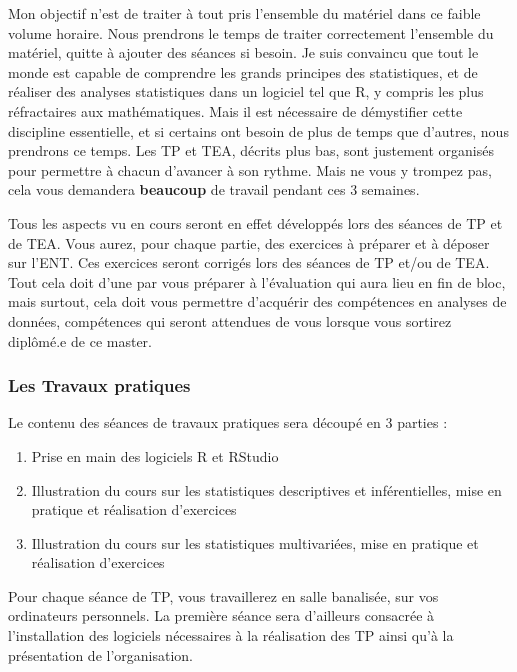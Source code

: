 \documentclass[a4paperpaper,]{article}
\providecommand{\tightlist}{%
  \setlength{\itemsep}{0pt}\setlength{\parskip}{0pt}}
\theoremstyle{definition}
\theoremstyle{definition}
\theoremstyle{definition}
\theoremstyle{remark}
\begin{document}
Mon objectif n'est de traiter à tout pris l'ensemble du matériel dans ce
faible volume horaire. Nous prendrons le temps de traiter correctement
l'ensemble du matériel, quitte à ajouter des séances si besoin. Je suis
convaincu que tout le monde est capable de comprendre les grands
principes des statistiques, et de réaliser des analyses statistiques
dans un logiciel tel que R, y compris les plus réfractaires aux
mathématiques. Mais il est nécessaire de démystifier cette discipline
essentielle, et si certains ont besoin de plus de temps que d'autres,
nous prendrons ce temps. Les TP et TEA, décrits plus bas, sont justement
organisés pour permettre à chacun d'avancer à son rythme. Mais ne vous y
trompez pas, cela vous demandera \textbf{beaucoup} de travail pendant
ces 3 semaines.

Tous les aspects vu en cours seront en effet développés lors des séances
de TP et de TEA. Vous aurez, pour chaque partie, des exercices à
préparer et à déposer sur l'ENT. Ces exercices seront corrigés lors des
séances de TP et/ou de TEA. Tout cela doit d'une par vous préparer à
l'évaluation qui aura lieu en fin de bloc, mais surtout, cela doit vous
permettre d'acquérir des compétences en analyses de données, compétences
qui seront attendues de vous lorsque vous sortirez diplômé.e de ce
master.

\hypertarget{les-travaux-pratiques}{%
\subsubsection{Les Travaux pratiques}\label{les-travaux-pratiques}}

Le contenu des séances de travaux pratiques sera découpé en 3 parties :

\begin{enumerate}
\def\labelenumi{\arabic{enumi}.}
\tightlist
\item
  Prise en main des logiciels R et RStudio
\item
  Illustration du cours sur les statistiques descriptives et
  inférentielles, mise en pratique et réalisation d'exercices
\item
  Illustration du cours sur les statistiques multivariées, mise en
  pratique et réalisation d'exercices
\end{enumerate}

Pour chaque séance de TP, vous travaillerez en salle banalisée, sur vos
ordinateurs personnels. La première séance sera d'ailleurs consacrée à
l'installation des logiciels nécessaires à la réalisation des TP ainsi
qu'à la présentation de l'organisation.
\end{document}
